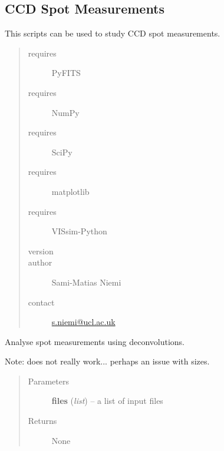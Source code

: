 \documentclass[a4paper,11pt,english]{sphinxmanual}
\begin{document}
\subsection{CCD Spot Measurements}
\label{analysis:ccd-spot-measurements}
This scripts can be used to study CCD spot measurements.
\begin{quote}\begin{description}
\item[{requires}] \leavevmode
PyFITS

\item[{requires}] \leavevmode
NumPy

\item[{requires}] \leavevmode
SciPy

\item[{requires}] \leavevmode
matplotlib

\item[{requires}] \leavevmode
VISsim-Python

\item[{version}] 

\item[{author}] \leavevmode
Sami-Matias Niemi

\item[{contact}] \leavevmode
\href{mailto:s.niemi@ucl.ac.uk}{s.niemi@ucl.ac.uk}

\end{description}\end{quote}

\begin{fulllineitems}
\label{analysis:analysis.analyseSpotMeasurements.analyseSpotsDeconvolution}
Analyse spot measurements using deconvolutions.

Note: does not really work... perhaps an issue with sizes.
\begin{quote}\begin{description}
\item[{Parameters}] \leavevmode
\textbf{files} (\emph{list}) -- a list of input files

\item[{Returns}] \leavevmode
None

\end{description}\end{quote}

\end{fulllineitems}
\end{document}
